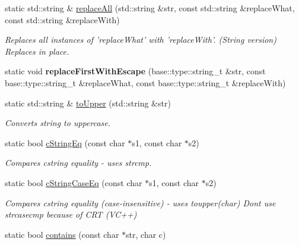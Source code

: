 \begin{DoxyCompactItemize}
static std\-::string \& \hyperlink{classel_1_1base_1_1utils_1_1Str_a8e823aa60b160451ca0b8732c3c75568}{replace\-All} (std\-::string \&str, const std\-::string \&replace\-What, const std\-::string \&replace\-With)
\begin{DoxyCompactList}\small\item\em Replaces all instances of 'replace\-What' with 'replace\-With'. (String version) Replaces in place. \end{DoxyCompactList}\item 
\hypertarget{classel_1_1base_1_1utils_1_1Str_a3725349f601d07316d1c2bc211daaaa1}{static void {\bfseries replace\-First\-With\-Escape} (base\-::type\-::string\-\_\-t \&str, const base\-::type\-::string\-\_\-t \&replace\-What, const base\-::type\-::string\-\_\-t \&replace\-With)}\label{classel_1_1base_1_1utils_1_1Str_a3725349f601d07316d1c2bc211daaaa1}

\item 
static std\-::string \& \hyperlink{classel_1_1base_1_1utils_1_1Str_a6a05315fb967508dc1faf0584421a95d}{to\-Upper} (std\-::string \&str)
\begin{DoxyCompactList}\small\item\em Converts string to uppercase. \end{DoxyCompactList}\item 
\hypertarget{classel_1_1base_1_1utils_1_1Str_a8081458c7848ff991d765c69f7858c44}{static bool \hyperlink{classel_1_1base_1_1utils_1_1Str_a8081458c7848ff991d765c69f7858c44}{c\-String\-Eq} (const char $\ast$s1, const char $\ast$s2)}\label{classel_1_1base_1_1utils_1_1Str_a8081458c7848ff991d765c69f7858c44}

\begin{DoxyCompactList}\small\item\em Compares cstring equality -\/ uses strcmp. \end{DoxyCompactList}\item 
\hypertarget{classel_1_1base_1_1utils_1_1Str_aaa37755d713b5e6475950134ce9ce0e8}{static bool \hyperlink{classel_1_1base_1_1utils_1_1Str_aaa37755d713b5e6475950134ce9ce0e8}{c\-String\-Case\-Eq} (const char $\ast$s1, const char $\ast$s2)}\label{classel_1_1base_1_1utils_1_1Str_aaa37755d713b5e6475950134ce9ce0e8}

\begin{DoxyCompactList}\small\item\em Compares cstring equality (case-\/insensitive) -\/ uses toupper(char) Dont use strcasecmp because of C\-R\-T (V\-C++) \end{DoxyCompactList}\item 
\hypertarget{classel_1_1base_1_1utils_1_1Str_a27cc1c1625b21597eb75df62b8fca0f8}{static bool \hyperlink{classel_1_1base_1_1utils_1_1Str_a27cc1c1625b21597eb75df62b8fca0f8}{contains} (const char $\ast$str, char c)}\label{classel_1_1base_1_1utils_1_1Str_a27cc1c1625b21597eb75df62b8fca0f8}


\end{DoxyCompactItemize}
